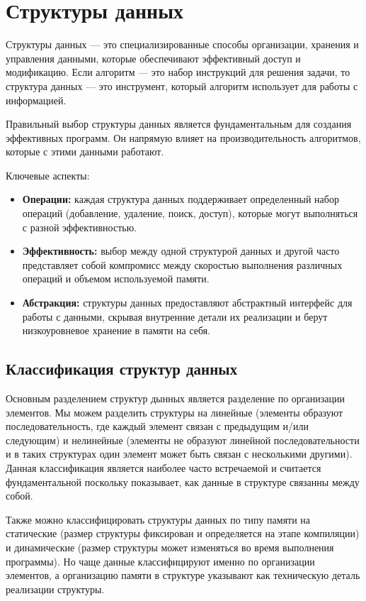 \documentclass[a4paper,12pt]{article}
\begin{document}
\section{Структуры данных}
\label{sec:структуры-данных}

Структуры данных --- это специализированные способы организации, хранения и управления данными, которые обеспечивают эффективный доступ и модификацию. Если алгоритм --- это набор инструкций для решения задачи, то структура данных --- это инструмент, который алгоритм использует для работы с информацией.

Правильный выбор структуры данных является фундаментальным для создания эффективных программ. Он напрямую влияет на производительность алгоритмов, которые с этими данными работают.

Ключевые аспекты:

\begin{itemize}
    \item \textbf{Операции:} каждая структура данных поддерживает определенный набор операций (добавление, удаление, поиск, доступ), которые могут выполняться с разной эффективностью.
    \item \textbf{Эффективность:} выбор между одной структурой данных и другой часто представляет собой компромисс между скоростью выполнения различных операций и объемом используемой памяти.
    \item \textbf{Абстракция:} структуры данных предоставляют абстрактный интерфейс для работы с данными, скрывая внутренние детали их реализации и берут низкоуровневое хранение в памяти на себя.
\end{itemize}

\subsection{Классификация структур данных}
\label{subsec:классификация-структур-данных}

Основным разделением структур дынных является разделение по организации элементов. Мы можем разделить структуры на линейные (элементы образуют последовательность, где каждый элемент связан с предыдущим и/или следующим) и нелинейные (элементы не образуют линейной последовательности и в таких структурах один элемент может быть связан с несколькими другими). Данная классификация является наиболее часто встречаемой и считается фундаментальной поскольку показывает, как данные в структуре связанны между собой.

Также можно классифицировать структуры данных по типу памяти на статические (размер структуры фиксирован и определяется на этапе компиляции) и динамические (размер структуры может изменяться во время выполнения программы). Но чаще данные классифицируют именно по организации элементов, а организацию памяти в структуре указывают как техническую деталь реализации структуры.
\end{document}

